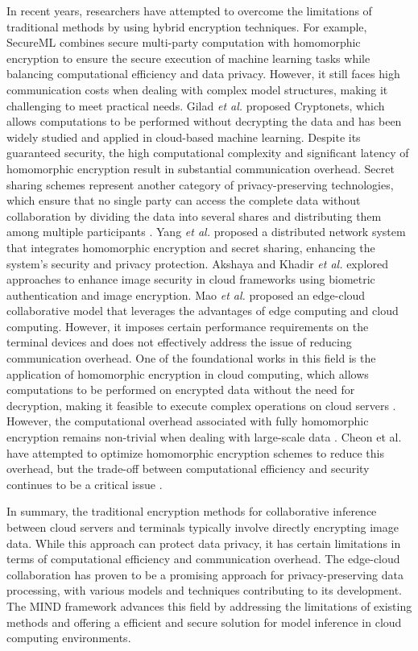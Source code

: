\documentclass[conference]{IEEEtran}
\begin{document}
In recent years, researchers have attempted to overcome the limitations of traditional methods by using hybrid encryption techniques. For example, SecureML \cite{mohassel2017secureml} combines secure multi-party computation with homomorphic encryption to ensure the secure execution of machine learning tasks while balancing computational efficiency and data privacy. However, it still faces high communication costs when dealing with complex model structures, making it challenging to meet practical needs. Gilad \textit{et al.} \cite{gilad2016cryptonets} proposed Cryptonets, which allows computations to be performed without decrypting the data and has been widely studied and applied in cloud-based machine learning. Despite its guaranteed security, the high computational complexity and significant latency of homomorphic encryption result in substantial communication overhead. Secret sharing schemes represent another category of privacy-preserving technologies, which ensure that no single party can access the complete data without collaboration by dividing the data into several shares and distributing them among multiple participants \cite{bogdanov2008sharemind}.
Yang \textit{et al.} \cite{yang2021distributed} proposed a distributed network system that integrates homomorphic encryption and secret sharing, enhancing the system's security and privacy protection. Akshaya and Khadir \textit{et al.} \cite{kakkad2019biometric} explored approaches to enhance image security in cloud frameworks using biometric authentication and image encryption.
Mao \textit{et al.} \cite{mao2017survey} proposed an edge-cloud collaborative model that leverages the advantages of edge computing and cloud computing. However, it imposes certain performance requirements on the terminal devices and does not effectively address the issue of reducing communication overhead.
One of the foundational works in this field is the application of homomorphic encryption in cloud computing, which allows computations to be performed on encrypted data without the need for decryption, making it feasible to execute complex operations on cloud servers \cite{gentry2009fully}. However, the computational overhead associated with fully homomorphic encryption remains non-trivial when dealing with large-scale data \cite{xu2019cryptonn}. Cheon et al. have attempted to optimize homomorphic encryption schemes to reduce this overhead, but the trade-off between computational efficiency and security continues to be a critical issue \cite{cheon2017homomorphic}.

In summary, the traditional encryption methods for collaborative inference between cloud servers and terminals typically involve directly encrypting image data. While this approach can protect data privacy, it has certain limitations in terms of computational efficiency and communication overhead. The edge-cloud collaboration has proven to be a promising approach for privacy-preserving data processing, with various models and techniques contributing to its development.  The MIND framework advances this field by addressing the limitations of existing methods and offering a efficient and secure solution for model inference in cloud computing environments.
\end{document}
